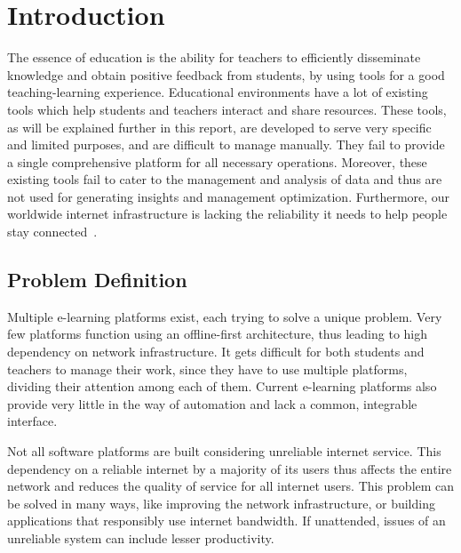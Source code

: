 \chapter{\centering Introduction}

\pagestyle{fancy}
\lhead{}
\rhead{}
\cfoot{}
\rfoot{\thepage}
\renewcommand{\headrulewidth}{2pt}
\renewcommand{\footrulewidth}{0.8pt}


The essence of education is the ability for teachers to efficiently 
disseminate knowledge and obtain positive feedback from students, by 
using tools for a good teaching-learning experience. 
Educational environments have a lot of existing tools which help students and teachers interact and share resources. These tools, as will be explained further in this report, are developed to serve very specific and limited purposes, and are difficult to manage manually. They fail to provide a 
single comprehensive platform for all necessary operations. 
Moreover, these existing tools fail to cater to the management and analysis of data and thus are not used for generating insights and management optimization. 
Furthermore, our worldwide internet infrastructure is lacking the reliability it needs to help people stay connected~\cite{WebF20}.

\section{Problem Definition}

Multiple e-learning platforms exist, each trying to solve a unique problem. 
Very few platforms function using an offline-first architecture, thus leading to 
high dependency on network infrastructure. 
It gets difficult for both students and teachers to manage their work, 
since they have to use multiple platforms, dividing their attention among each of them. 
Current e-learning platforms also provide very little in the way of automation and lack a common, integrable interface.

Not all software platforms are built considering unreliable internet service. 
This dependency on a reliable internet by a majority of its users thus affects the entire network and reduces the quality of service for all internet users. This problem can be solved in many ways, 
like improving the network infrastructure, or building applications that responsibly use internet bandwidth. If unattended, issues of an unreliable system can include lesser productivity.

